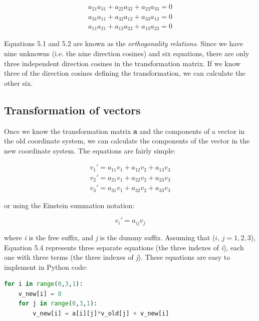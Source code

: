 \documentclass[a4paper , 12pt]{book}
\begin{document}
\begin{equation}
    \begin{split}
        a_{21}a_{31}+a_{22}a_{32}+a_{23}a_{33}=0 \\
        a_{31}a_{11}+a_{32}a_{12}+a_{33}a_{13}=0 \\
        a_{11}a_{21}+a_{12}a_{22}+a_{13}a_{23}=0
    \end{split}
\end{equation}

Equations 5.1 and 5.2 are known as the \textit{orthogonality relations}. Since we have nine unknowns (i.e. the nine direction cosines) and six equations, there are only three independent direction cosines in the transformation matrix. If we know three of the direction cosines defining the transformation, we can calculate the other six.

\subsection{Transformation of vectors}

Once we know the transformation matrix \textbf{a} and the components of a vector in the old coordinate system, we can calculate the components of the vector in the new coordinate system. The equations are fairly simple:

\begin{equation}
    \begin{split}
        v_1\text{$'$}=a_{11}v_1+a_{12}v_2+a_{13}v_3 \\
        v_2\text{$'$}=a_{21}v_1+a_{22}v_2+a_{23}v_3 \\
        v_3\text{$'$}=a_{31}v_1+a_{32}v_2+a_{33}v_3
    \end{split}
\end{equation}

or using the Einstein summation notation:

\begin{equation}
    v_i\text{$'$}=a_{ij}v_j
\end{equation}

where \textit{i} is the free suffix, and \textit{j} is the dummy suffix. Assuming that ($i,\,j=1,2,3$), Equation 5.4 represents three separate equations (the three indexes of \textit{i}), each one with three terms (the three indexes of \textit{j}). These equations are easy to implement in Python code:

\begin{center}
\begin{lstlisting}[language=Python, frame=single]
for i in range(0,3,1):
    v_new[i] = 0
    for j in range(0,3,1):
        v_new[i] = a[i][j]*v_old[j] + v_new[i]
\end{lstlisting}
\end{center}
\end{document}
